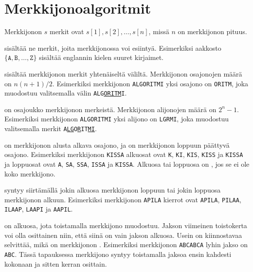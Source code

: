 \chapter{Merkkijonoalgoritmit}


Merkkijonon $s$ merkit ovat $s[1],s[2],\ldots,s[n]$,
missä $n$ on merkkijonon pituus.

 sisältää ne merkit,
joita merkkijonossa voi esiintyä.
Esimerkiksi aakkosto $\{\texttt{A},\texttt{B},\ldots,\texttt{Z}\}$
sisältää englannin kielen suuret kirjaimet.


sisältää merkkijonon merkit
yhtenäiseltä väliltä.
Merkkijonon osajonojen määrä on $n(n+1)/2$.
Esimerkiksi merkkijonon \texttt{ALGORITMI}
yksi osajono on \texttt{ORITM},
joka muodostuu valitsemalla välin \texttt{ALG\underline{ORITM}I}.


on osajoukko merkkijonon merkeistä.
Merkkijonon alijonojen määrä on $2^n-1$.
Esimerkiksi merkkijonon \texttt{ALGORITMI}
yksi alijono on \texttt{LGRMI}, joka muodostuu
valitsemalla merkit \texttt{A\underline{LG}O\underline{R}IT\underline{MI}}.


 on merkkijonon
alusta alkava osajono,
ja  on merkkijonon
loppuun päättyvä osajono.
Esimerkiksi merkkijonon \texttt{KISSA}
alkuosat ovat \texttt{K}, \texttt{KI},
\texttt{KIS}, \texttt{KISS} ja \texttt{KISSA}
ja loppuosat ovat \texttt{A}, \texttt{SA},
\texttt{SSA}, \texttt{ISSA} ja \texttt{KISSA}.
Alkuosa tai loppuosa on ,
jos se ei ole koko merkkijono.


 syntyy
siirtämällä jokin alkuosa merkkijonon loppuun
tai jokin loppuosa merkkijonon alkuun.
Esimerkiksi merkkijonon \texttt{APILA}
kierrot ovat
\texttt{APILA},
\texttt{PILAA},
\texttt{ILAAP},
\texttt{LAAPI} ja
\texttt{AAPIL}.


 on alkuosa,
jota toistamalla merkkijono muodostuu.
Jakson viimeinen toistokerta voi olla osittainen
niin, että siinä on vain jakson alkuosa.
Usein on kiinnostavaa selvittää, mikä on merkkijonon
.
Esimerkiksi merkkijonon \texttt{ABCABCA} lyhin jakso on \texttt{ABC}.
Tässä tapauksessa merkkijono syntyy toistamalla jaksoa ensin kahdesti kokonaan
ja sitten kerran osittain.

